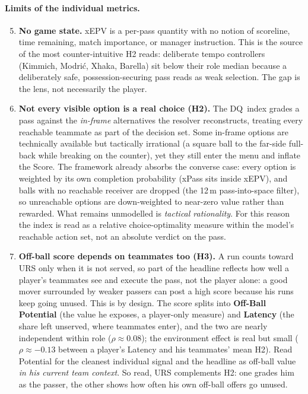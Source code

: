\documentclass[12pt,a4paper]{article}
\begin{document}
\paragraph{Limits of the individual metrics.}
\begin{enumerate}\setcounter{enumi}{4}
    \item \textbf{No game state.}\label{lim:game-state} xEPV is a per-pass quantity with no notion of scoreline, time remaining, match importance, or manager instruction. This is the source of the most counter-intuitive H2 reads: deliberate tempo controllers (Kimmich, Modri\'{c}, Xhaka, Barella) sit below their role median because a deliberately safe, possession-securing pass reads as weak selection. The gap is the lens, not necessarily the player.

    \item \textbf{Not every visible option is a real choice (H2).} The DQ~index grades a pass against the \emph{in-frame} alternatives the resolver reconstructs, treating every reachable teammate as part of the decision set. Some in-frame options are technically available but tactically irrational (a square ball to the far-side full-back while breaking on the counter), yet they still enter the menu and inflate the Score. The framework already absorbs the converse case: every option is weighted by its own completion probability (xPass sits inside xEPV), and balls with no reachable receiver are dropped (the 12\,m pass-into-space filter), so unreachable options are down-weighted to near-zero value rather than rewarded. What remains unmodelled is \emph{tactical rationality}. For this reason the index is read as a relative choice-optimality measure within the model's reachable action set, not an absolute verdict on the pass.

    \item \textbf{Off-ball score depends on teammates too (H3).} A run counts toward URS only when it is not served, so part of the headline reflects how well a player's teammates see and execute the pass, not the player alone: a good mover surrounded by weaker passers can post a high score because his runs keep going unused. This is by design. The score splits into \textbf{Off-Ball Potential} (the value he exposes, a player-only measure) and \textbf{Latency} (the share left unserved, where teammates enter), and the two are nearly independent within role ($\rho \approx 0.08$); the environment effect is real but small ($\rho \approx -0.13$ between a player's Latency and his teammates' mean H2). Read Potential for the cleanest individual signal and the headline as off-ball value \emph{in his current team context}. So read, URS complements H2: one grades him as the passer, the other shows how often his own off-ball offers go unused.


\end{enumerate}
\end{document}
